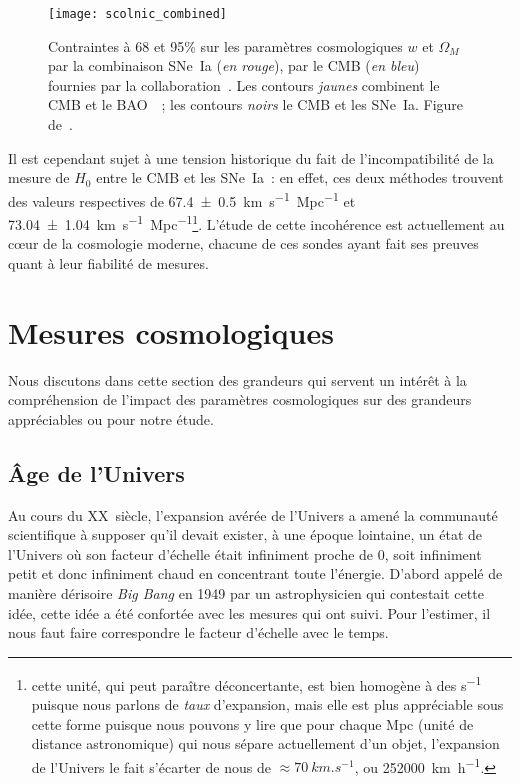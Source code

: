 \documentclass[../main/main.tex]{subfiles}
\begin{document}
\begin{SCfigure}[1][ht]
    \centering
    \texttt{[image: scolnic\_combined]}
    \caption[Contraintes sur les paramètres cosmologiques $w$ et $\Omega_M$ par
    la combinaison SNe~Ia, CMB et BAO]{Contraintes à 68 et 95\% sur les
        paramètres cosmologiques $w$ et $\Omega_M$ par la combinaison SNe~Ia
        (\textit{en rouge}), par le CMB (\textit{en bleu}) fournies par la
        collaboration~\cite{planck2015}. Les contours \textit{jaunes} combinent
        le CMB et le BAO~\citep{alam2015}~; les contours \textit{noirs} le CMB
    et les SNe~Ia. Figure de~\cite{scolnic2018}.}\label{fig:cosmocomb}
\end{SCfigure}

Il est cependant sujet à une tension historique du fait de l'incompatibilité de
la mesure de $H_0$ entre le CMB et les SNe~Ia~: en effet, ces deux méthodes
trouvent des valeurs respectives de \SI{67.4\pm0.5}{km.s^{-1}.Mpc^{-1}} et
\SI{73.04\pm1.04}{km.s^{-1}.Mpc^{-1}}\footnote{cette unité, qui peut paraître
    déconcertante, est bien homogène à des \si{s^{-1}} puisque nous parlons de
    \textit{taux} d'expansion, mais elle est plus appréciable sous cette forme
    puisque nous pouvons y lire que pour chaque \si{Mpc} (unité de distance
    astronomique) qui nous sépare actuellement d'un objet, l'expansion de
    l'Univers le fait s'écarter de nous de $\approx \SI{70}{km.s^{-1}}$, ou
\SI{252000}{km.h^{-1}}.}. L'étude de cette incohérence est actuellement au
cœur de la cosmologie moderne, chacune de ces sondes ayant fait ses preuves
quant à leur fiabilité de mesures.

\section{Mesures cosmologiques}\label{sec:dist}

Nous discutons dans cette section des grandeurs qui servent un intérêt à la
compréhension de l'impact des paramètres cosmologiques sur des grandeurs
appréciables ou pour notre étude.

\subsection{Âge de l'Univers}\label{ssec:age}

Au cours du XX\ieme~siècle, l'expansion avérée de l'Univers a amené la
communauté scientifique à supposer qu'il devait exister, à une époque lointaine,
un état de l'Univers où son facteur d'échelle était infiniment proche de 0, soit
infiniment petit et donc infiniment chaud en concentrant toute l'énergie.
D'abord appelé de manière dérisoire \textit{Big Bang} en 1949 par un
astrophysicien qui contestait cette idée, cette idée a été confortée avec les
mesures qui ont suivi. Pour l'estimer, il nous faut faire correspondre le
facteur d'échelle avec le temps.
\end{document}
